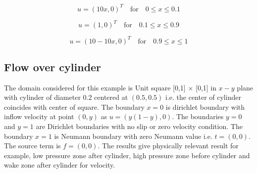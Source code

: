 \documentclass[a4paper]{book}
\begin{document}
\begin{center}

\begin{equation}
u = (10x,0)^T \quad \textrm{for} \quad 0 \leq x \leq 0.1
\end{equation}

\begin{equation}
u = (1,0)^T \quad \textrm{for} \quad 0.1 \leq x \leq 0.9
\end{equation}

\begin{equation}
u = (10 - 10x,0)^T \quad \textrm{for} \quad 0.9 \leq x \leq 1
\end{equation}

\end{center}

\subsection{Flow over cylinder} \label{flow_over_cylinder_stokes}

The domain considered for this example is Unit square [0,1] $\times$ [0,1] in $x-y$ plane with cylinder of diameter 0.2 centered at $(0.5,0.5)$ i.e. the center of cylinder coincides with center of square. The boundary ${x=0}$ is dirichlet boundary with inflow velocity at point $(0,y)$ as $u = (y(1-y), 0)$. The boundaries ${y = 0}$ and ${y = 1}$ are Dirichlet boundaries with no slip or zero velocity condition. The boundary ${x = 1}$ is Neumann boundary with zero Neumann value i.e. $t = (0, 0)$. The source term is $f = (0, 0)$. The results give physically relevant result for example, low pressure zone after cylinder, high pressure zone before cylinder and wake zone after cylinder for velocity.
\end{document}
